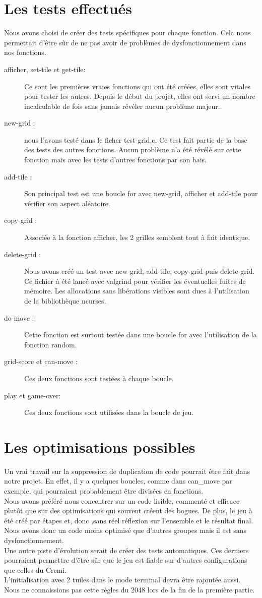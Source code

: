 \documentclass{report}
\begin{document}
\section{Les tests effectués}
Nous avons choisi de créer des tests spécifiques pour chaque fonction. Cela nous permettait d'être sûr de ne pas avoir de problèmes de dysfonctionnement dans nos fonctions.
\begin{description}
\item [afficher, set-tile et get-tile:] Ce sont les premières vraies fonctions qui ont été créées, elles sont vitales pour tester les autres. Depuis le début du projet, elles ont servi un nombre incalculable de fois sans jamais révéler aucun problème majeur.
\item [new-grid :] nous l'avons testé dans le ficher test-grid.c. Ce test fait partie de la base des tests des autres fonctions. Aucun problème n'a été révélé sur cette fonction mais avec les tests d'autres fonctions par son bais.
\item [add-tile :] Son principal test est une boucle for avec new-grid, afficher et add-tile pour vérifier son aspect aléatoire.
\item [copy-grid :]Associée à la fonction afficher, les 2 grilles semblent tout à fait identique.
\item [delete-grid :] Nous avons créé un test avec new-grid, add-tile, copy-grid puis delete-grid. Ce fichier à été lancé avec valgrind pour vérifier les éventuelles fuites de mémoire. Les allocations sans libérations visibles sont dues à l'utilisation de la bibliothèque ncurses.
\item [do-move :] Cette fonction est surtout testée dans une boucle for avec l'utilisation de la fonction random.
\item [grid-score et can-move :] Ces deux fonctions sont testées à chaque boucle.
\item [play et game-over:]Ces deux fonctions sont utilisées dans la boucle de jeu. 
\end{description}

\section{Les optimisations possibles}
Un vrai travail sur la suppression de duplication de code pourrait être fait dans notre projet. En effet, il y a quelques boucles, comme dans can\_move par exemple, qui pourraient probablement être divisées en fonctions.\\ Nous avons préféré nous concentrer sur un code lisible, commenté et efficace plutôt que sur des optimisations qui souvent créent des bogues. De plus, le jeu à été créé par étapes et, donc ,sans réel réflexion sur l'ensemble et le résultat final. Nous avons donc un code moins optimisé que d'autres groupes mais il est sans dysfonctionnement.\\
Une autre piste d'évolution serait de créer des tests automatiques. Ces derniers pourraient permettre d'être sûr que le jeu est fiable sur d'autres configurations que celles du Cremi.\\
L'initialisation avec 2 tuiles dans le mode terminal devra être rajoutée aussi. Nous ne connaissions pas cette règles du 2048 lors de la fin de la première partie.
\end{document}
